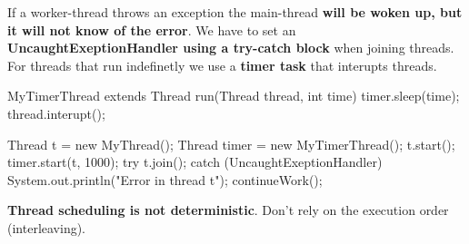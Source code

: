 \begin{important}
If a worker-thread throws an exception the main-thread \textbf{will be woken up, but it will not know of the
error}. We have to set an \textbf{UncaughtExeptionHandler using a try-catch block} when joining threads. For threads that
run indefinetly we use a \textbf{timer task} that interupts threads.
\end{important}

\begin{codeexample}
MyTimerThread extends Thread {
    run(Thread thread, int time) {
        timer.sleep(time);
        thread.interupt();
    }
}

Thread t = new MyThread();
Thread timer = new MyTimerThread();
t.start();
timer.start(t, 1000);
try {
    t.join();
} catch (UncaughtExeptionHandler) {
    System.out.println("Error in thread t");
}
continueWork();
\end{codeexample}

\begin{important}
\textbf{Thread scheduling is not deterministic}. Don't rely on the execution order (interleaving).
\end{important}

